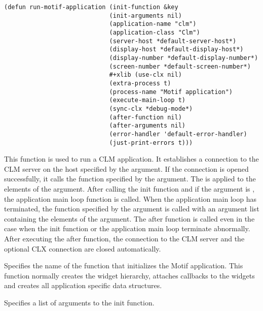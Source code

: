 \begin{lispd}
\syntax
\fnsize\begin{verbatim}
(defun run-motif-application (init-function &key
                             (init-arguments nil)
                             (application-name "clm")
                             (application-class "Clm")
                             (server-host *default-server-host*)
                             (display-host *default-display-host*)
                             (display-number *default-display-number*)
                             (screen-number *default-screen-number*)
                             #+xlib (use-clx nil)
                             (extra-process t)
                             (process-name "Motif application")
                             (execute-main-loop t)
                             (sync-clx *debug-mode*)
                             (after-function nil)
                             (after-arguments nil)
                             (error-handler 'default-error-handler)
                             (just-print-errors t)))
\end{verbatim}\normalsize
\beschr This function is used to run a CLM application.  It establishes a
connection to the CLM server on the host specified by the 
argument.  If the connection is opened successfully, it calls the function
specified by the  argument.  The  is
applied to the elements of the  argument.  After calling the
init function and if the  argument is , the
application main loop function is called.  When the application main loop has
terminated, the function specified by the  argument is called
with an argument list containing the elements of the 
argument.  The after function is called even in the case when the init function
or the application main loop terminate abnormally.  After executing the after
function, the connection to the CLM server and the optional CLX connection are
closed automatically. 

\parameter\begin{paramd}
 Specifies the name of the function that initializes the
Motif application.  This function normally creates the widget hierarchy,
attaches callbacks to the widgets and creates all application specific data
structures. 

 Specifies a list of arguments to the init function. 


\end{paramd}
\end{lispd}
